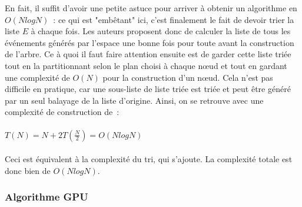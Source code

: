 \documentclass[a4paper]{article}
\begin{document}
En fait, il suffit d'avoir une petite astuce pour arriver à obtenir un algorithme en $O(NlogN)$~: ce qui est "embêtant" ici, c'est finalement le fait de devoir trier la liste $E$ à chaque fois. Les auteurs proposent donc de calculer la liste de tous les événements générés par l'espace une bonne fois pour toute avant la construction de l'arbre. Ce à quoi il faut faire attention ensuite est de garder cette liste triée tout en la partitionnant selon le plan choisi à chaque nœud et tout en gardant une complexité de $O(N)$ pour la construction d'un nœud. Cela n'est pas difficile en pratique, car une sous-liste de liste triée est triée et peut être généré par un seul balayage de la liste d'origine. Ainsi, on se retrouve avec une complexité de construction de~:
\\\\
$T(N) = N + 2T(\frac{N}{2}) = O(NlogN)$
\\\\
Ceci est équivalent à la complexité du tri, qui s'ajoute. La complexité totale est donc bien de $O(NlogN)$.

\subsubsection{Algorithme GPU}
\end{document}
